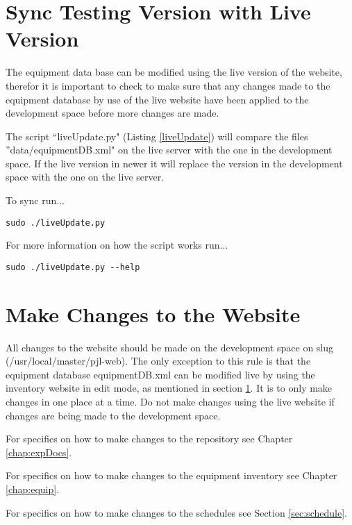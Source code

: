 \documentclass[justified]{LabArx3_5_1}
\begin{document}
\section{Sync Testing Version with Live Version}\label{sec:initsync}

The equipment data base can be modified using the live version of the website, therefor it is important to check to make sure that any changes made to the equipment database by use of the live website have been applied to the development space before more changes are made. 

The script ``liveUpdate.py" (Listing \ref{liveUpdate}) will compare the files ''data/equipmentDB.xml" on the live server with the one in the development space. If the live version in newer it will replace the version in the development space with the one on the live server.


\noindent To sync run...
\begin{lstlisting}[backgroundcolor = \color{light-gray}]
sudo ./liveUpdate.py
\end{lstlisting}
\vspace{-1em}
\noindent For more information on how the script works run...

\begin{lstlisting}[backgroundcolor = \color{light-gray}]
sudo ./liveUpdate.py --help
\end{lstlisting}


\section{Make Changes to the Website}\label{sec:makeChanges}

All changes to the website should be made on the development space on slug (/usr/local/master/pjl-web). The only exception to this rule is that the equipment database equipmentDB.xml can be modified live by using the inventory website in edit mode, as mentioned in section \ref{sec:initsync}. It is to only make changes in one place at a time. Do not make changes using the live website if changes are being made to the development space. 

For specifics on how to make changes to the repository see Chapter \ref{chap:expDocs}.

For specifics on how to make changes to the equipment inventory see Chapter \ref{chap:equip}.

For specifics on how to make changes to the schedules see Section \ref{sec:schedule}.
\end{document}
